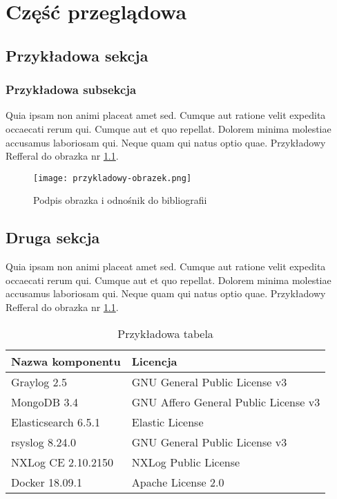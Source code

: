\chapter{Część przeglądowa}

\section{Przykładowa sekcja}


\subsection{Przykładowa subsekcja}
Quia ipsam non animi placeat amet sed. Cumque aut ratione velit expedita occaecati rerum qui. Cumque aut et quo repellat. Dolorem minima molestiae accusamus laboriosam qui. Neque quam qui natus optio quae. Przykładowy Refferal do obrazka nr \ref{fig:przykladowy-obrazek}.

\begin{figure}[ht]
        \centering
        \texttt{[image: przykladowy-obrazek.png]}
        \caption{Podpis obrazka i odnośnik do bibliografii \cite{przykladowy-obrazek}}
        \label{fig:przykladowy-obrazek}
\end{figure}

\newpage

\section{Druga sekcja}
Quia ipsam non animi placeat amet sed. Cumque aut ratione velit expedita occaecati rerum qui. Cumque aut et quo repellat. Dolorem minima molestiae accusamus laboriosam qui. Neque quam qui natus optio quae. Przykładowy Refferal do obrazka nr \ref{table:przykladowa-tabela}.

\begin{table}[htb]
	\centering
	\caption{Przykładowa tabela}
	\label{table:przykladowa-tabela}

    \begin{tabular}{| l | l |}
    \hline
    Nazwa komponentu & Licencja \\ \hline
    Graylog 2.5 & GNU General Public License v3 \\ \hline
    MongoDB 3.4 & GNU Affero General Public License v3 \\ \hline
    Elasticsearch 6.5.1 & Elastic License \cite{elastic-license} \\ \hline
    rsyslog 8.24.0 & GNU General Public License v3  \\ \hline
    NXLog CE 2.10.2150& NXLog Public License  \\ \hline
    Docker 18.09.1 & Apache License 2.0  \\
    \hline
    \end{tabular}
\end{table}

\newpage
